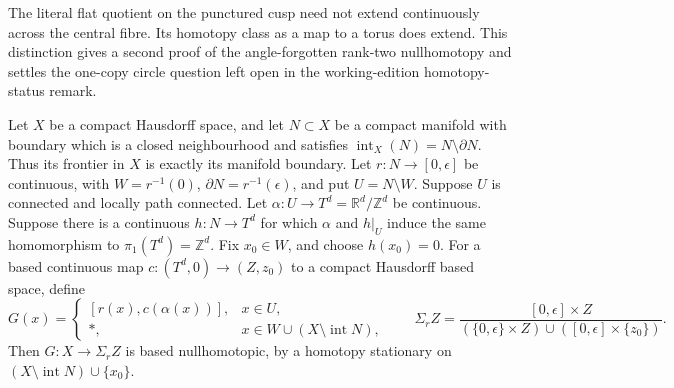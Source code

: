 The literal flat quotient on the punctured cusp need not extend
continuously across the central fibre. Its homotopy class as a map to a
torus does extend. This distinction gives a second proof of the
angle-forgotten rank-two nullhomotopy and settles the one-copy circle
question left open in the working-edition homotopy-status remark.

\begin{lemma}
\label{mapsIII:carrier-extension-lemma}

Let $X$ be a compact Hausdorff space, and let $N\subset X$ be a compact
manifold with boundary which is a closed neighbourhood and satisfies
$\operatorname{int}_X(N)=N\setminus\partial N$.
Thus its frontier in $X$ is exactly its manifold boundary.
Let $r:N\to[0,\epsilon]$ be continuous, with
$W=r^{-1}(0)$, $\partial N=r^{-1}(\epsilon)$, and put
$U=N\setminus W$. Suppose $U$ is connected and locally path connected.
Let $\alpha:U\to T^d=\mathbb R^d/\mathbb Z^d$ be continuous.
Suppose there is a continuous $h:N\to T^d$ for which
$\alpha$ and $h|_U$ induce the same homomorphism to
$\pi_1(T^d)=\mathbb Z^d$. Fix $x_0\in W$, and choose $h(x_0)=0$.
For a based continuous map $c:(T^d,0)\to(Z,z_0)$ to a compact
Hausdorff based space, define
\[
 G(x)=
 \begin{cases}
 [r(x),c(\alpha(x))],&x\in U,\\
 *,&x\in W\cup(X\setminus\operatorname{int}N),
 \end{cases}
 \qquad
 \Sigma_r Z=
 \frac{[0,\epsilon]\times Z}
 {(\{0,\epsilon\}\times Z)\cup([0,\epsilon]\times\{z_0\})}.
\]
Then $G:X\to\Sigma_rZ$ is based nullhomotopic, by a homotopy
stationary on $(X\setminus\operatorname{int}N)\cup\{x_0\}$.
\end{lemma}



